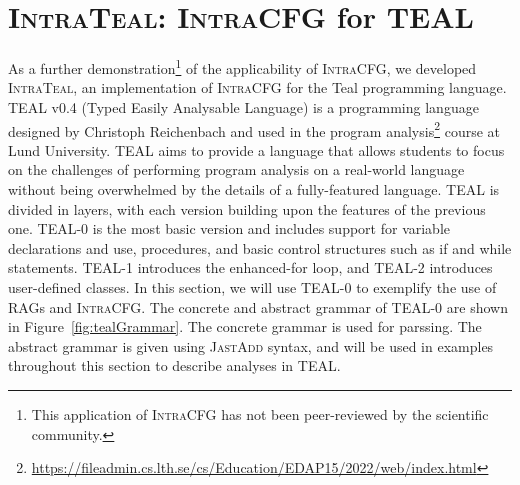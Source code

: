 \section{\textsc{IntraTeal}: \textsc{IntraCFG} for TEAL}
\label{sec:intraTeal}
As a further demonstration\footnote{This application of \textsc{IntraCFG} has not been
peer-reviewed by the scientific community.} of the applicability of \textsc{IntraCFG},
we developed \textsc{IntraTeal}, an implementation of \textsc{IntraCFG} for the Teal programming language.
TEAL v0.4 (Typed Easily Analysable Language) is a programming language designed by Christoph Reichenbach and used in the
program analysis\footnote{\url{https://fileadmin.cs.lth.se/cs/Education/EDAP15/2022/web/index.html}} course at Lund University.
TEAL aims to provide a language that allows students to
focus on the challenges of performing program analysis on a real-world language
without being overwhelmed by the details of a fully-featured language.
TEAL is divided in layers, with each version building
upon the features of the previous one. TEAL-0 is the most basic version and includes
support for variable declarations and use, procedures, and basic control structures such as if
and while statements. TEAL-1 introduces the enhanced-for loop, and TEAL-2
introduces user-defined classes. 
In this section,  we will use TEAL-0 to exemplify the use of RAGs
and \textsc{IntraCFG}.
The concrete and abstract grammar of TEAL-0 are shown in Figure~\ref{fig:tealGrammar}.
The concrete grammar is used for parssing. The abstract grammar is given using
\textsc{JastAdd} syntax, and will be used in examples throughout this section 
to describe analyses in TEAL.
\newsavebox{\mylistingbox}

